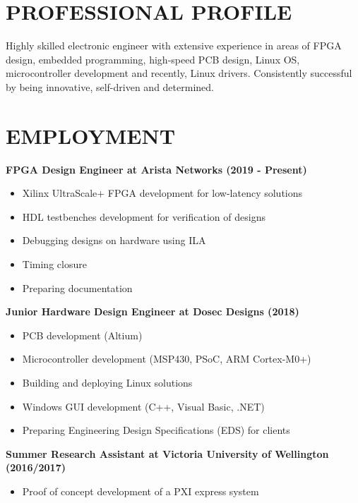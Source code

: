 \documentclass{res}
\begin{document}
\thispagestyle{empty} %

\begin{resume}

\section{PROFESSIONAL PROFILE}
\vspace{0.1in}
  Highly skilled electronic engineer with extensive experience in areas of 
  FPGA design, embedded programming, high-speed PCB design, Linux OS, 
  microcontroller development and recently, Linux drivers. 
  Consistently successful by being innovative, self-driven and determined.

\section{EMPLOYMENT}
\vspace{0.1in}
  {\bf FPGA Design Engineer at Arista Networks (2019 - Present)}
    \begin{itemize}[noitemsep]
      \item Xilinx UltraScale+ FPGA development for low-latency solutions
      \item HDL testbenches development for verification of designs
      \item Debugging designs on hardware using ILA
      \item Timing closure
      \item Preparing documentation
    \end{itemize}
  {\bf Junior Hardware Design Engineer at Dosec Designs (2018)}
    \begin{itemize}[noitemsep]
      \item PCB development (Altium)
      \item Microcontroller development (MSP430, PSoC, ARM Cortex-M0+)
      \item Building and deploying Linux solutions
      \item Windows GUI development (C++, Visual Basic, .NET)
      \item Preparing Engineering Design Specifications (EDS) for clients
    \end{itemize}
  {\bf Summer Research Assistant at Victoria University of Wellington (2016/2017)}
    \begin{itemize}[noitemsep]
      \item Proof of concept development of a PXI express system

\end{itemize}
\end{resume}
\end{document}
